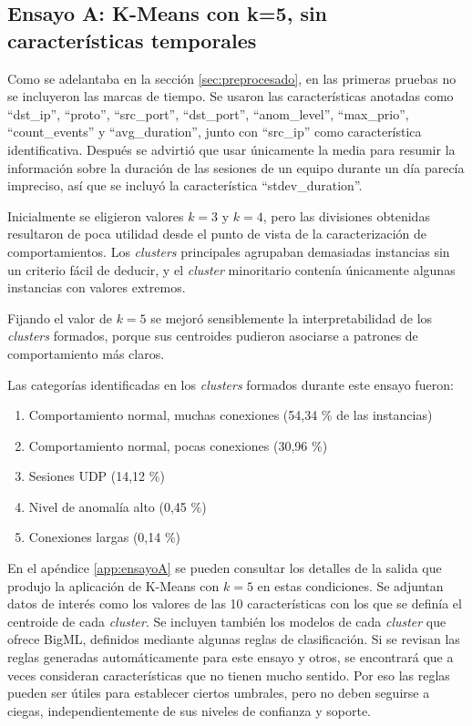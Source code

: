 \subsection{Ensayo A: K-Means con k=5, sin características temporales}\label{subsec:ensayoA}

Como se adelantaba en la sección \ref{sec:preprocesado}, en las primeras pruebas no se incluyeron las marcas de tiempo.
Se usaron las características anotadas como ``dst\_ip'', ``proto'', ``src\_port'', ``dst\_port'', ``anom\_level'', ``max\_prio'', ``count\_events'' y ``avg\_duration'',
junto con ``src\_ip'' como característica identificativa.
Después se advirtió que usar únicamente la media para resumir la información sobre la duración de las sesiones de un equipo durante un día parecía impreciso,
así que se incluyó la característica ``stdev\_duration''.

Inicialmente se eligieron valores $k=3$ y $k=4$, pero las divisiones obtenidas resultaron de poca utilidad desde el punto de vista de la caracterización de comportamientos.
Los \emph{clusters} principales agrupaban demasiadas instancias sin un criterio fácil de deducir, y el \emph{cluster} minoritario contenía únicamente algunas instancias con valores extremos.

Fijando el valor de $k=5$ se mejoró sensiblemente la interpretabilidad de los \emph{clusters} formados,
porque sus centroides pudieron asociarse a patrones de comportamiento más claros.

Las categorías identificadas en los \emph{clusters} formados durante este ensayo fueron:
\begin{enumerate}
    \item Comportamiento normal, muchas conexiones (54,34 \% de las instancias)
    \item Comportamiento normal, pocas conexiones (30,96 \%)
    \item Sesiones UDP (14,12 \%)
    \item Nivel de anomalía alto (0,45 \%)
    \item Conexiones largas (0,14 \%)
\end{enumerate}

En el apéndice \ref{app:ensayoA} se pueden consultar los detalles de la salida que produjo la aplicación de K-Means con $k=5$ en estas condiciones.
Se adjuntan datos de interés como los valores de las 10 características con los que se definía el centroide de cada \emph{cluster}.
Se incluyen también los modelos de cada \emph{cluster} que ofrece BigML, definidos mediante algunas reglas de clasificación.
Si se revisan las reglas generadas automáticamente para este ensayo y otros, se encontrará que a veces consideran características que no tienen mucho sentido.
Por eso las reglas pueden ser útiles para establecer ciertos umbrales, pero no deben seguirse a ciegas, independientemente de sus niveles de confianza y soporte.

